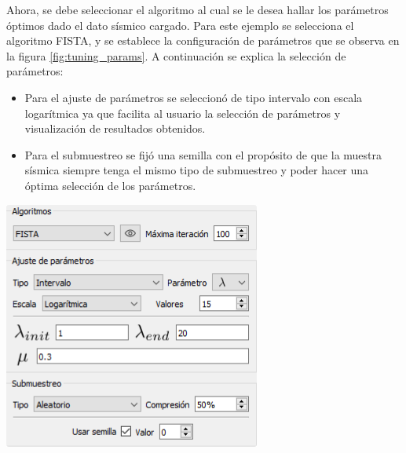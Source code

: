 \documentclass[12pt,twoside,letter]{ol-softwaremanual}
\newenvironment{Figure}
  {\par\medskip\noindent\minipage{\linewidth}}
  {\endminipage\par\medskip}
\begin{document}
\begin{multicols}{2}

Ahora, se debe seleccionar el algoritmo al cual se le desea hallar los parámetros óptimos dado el dato sísmico cargado. Para este ejemplo se selecciona el algoritmo FISTA, y se establece la configuración de parámetros que se observa en la figura \ref{fig:tuning_params}. A continuación se explica la selección de parámetros:

\begin{itemize}
    \item Para el ajuste de parámetros se seleccionó de tipo intervalo con escala logarítmica ya que facilita al usuario la selección de parámetros y visualización de resultados obtenidos.
    \item Para el submuestreo se fijó una semilla con el propósito de que la muestra sísmica siempre tenga el mismo tipo de submuestreo y poder hacer una óptima selección de los parámetros.
\end{itemize}

\begin{Figure}
    \centering
    \includegraphics[width=1\linewidth]{tuning-params.png}
    \label{fig:tuning_params}
\end{Figure}

\end{multicols}
\end{document}
